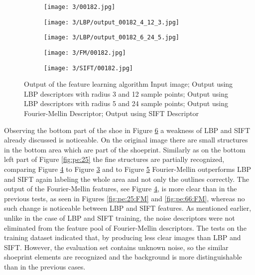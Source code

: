 \documentclass[draft,final]{vutinfth} %
\begin{document}
\begin{figure}[h]
  \centering
  \begin{subfigure}[t]{0.19\columnwidth}
    \centering
    \texttt{[image: 3/00182.jpg]}
    \subcaption{}
    \label{fig:pe:182:orig}
  \end{subfigure}
  \begin{subfigure}[t]{0.19\columnwidth}
    \centering
    \texttt{[image: 3/LBP/output\_00182\_4\_12\_3.jpg]}
    \subcaption{}
    \label{fig:pe:182:LBPs}
  \end{subfigure}
  \begin{subfigure}[t]{0.19\columnwidth}
    \centering
    \texttt{[image: 3/LBP/output\_00182\_6\_24\_5.jpg]}
    \subcaption{}
    \label{fig:pe:182:LBPb}
  \end{subfigure}
  \begin{subfigure}[t]{0.19\columnwidth}
    \centering
    \texttt{[image: 3/FM/00182.jpg]}
    \subcaption{}
    \label{fig:pe:182:FM}
  \end{subfigure}
  \begin{subfigure}[t]{0.19\columnwidth}
    \centering
    \texttt{[image: 3/SIFT/00182.jpg]}
    \subcaption{}
    \label{fig:pe:182:SIFT}
  \end{subfigure}
  \caption{Output of the feature learning algorithm  Input image;  Output using LBP descriptors with radius 3 and 12 sample points;  Output using LBP descriptors with radius 5 and 24 sample points;  Output using Fourier-Mellin Descriptor;  Output using SIFT Descriptor}
  \label{fig:pe:182}
\end{figure}

\par
Observing the bottom part of the shoe in Figure \ref{fig:pe:182} a weakness of LBP and SIFT already discussed is noticeable.
On the original image there are small structures in the bottom area which are part of the shoeprint.
Similarly as on the bottom left part of Figure \ref{fig:pe:25} the fine structures are partially recognized, comparing Figure \ref{fig:pe:182:FM} to Figure \ref{fig:pe:182:LBPb} and to Figure \ref{fig:pe:182:SIFT} Fourier-Mellin outperforms LBP and SIFT again labeling the whole area and not only the outlines correctly.
The output of the Fourier-Mellin features, see Figure \ref{fig:pe:182:FM}, is more clear than in the previous tests, as seen in Figures \ref{fig:pe:25:FM} and \ref{fig:pe:66:FM}, whereas no such change is noticeable between LBP and SIFT features.
As mentioned earlier, unlike in the case of LBP and SIFT training, the noise descriptors were not eliminated from the feature pool of Fourier-Mellin descriptors.
The tests on the training dataset indicated that, by producing less clear images than LBP and SIFT.
However, the evaluation set contains unknown noise, so the similar shoeprint elements are recognized and the background is more distinguishable than in the previous cases.
\end{document}
